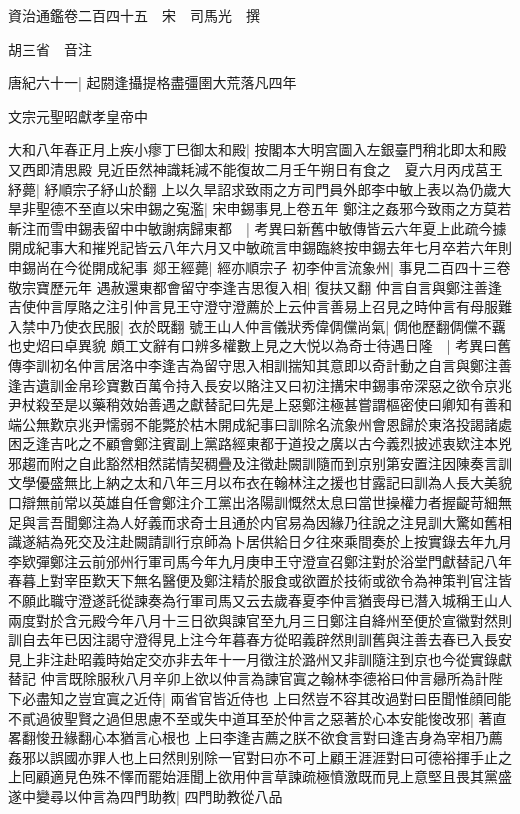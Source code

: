 資治通鑑卷二百四十五　宋　司馬光　撰

胡三省　音注

唐紀六十一|{
	起閼逢攝提格盡彊圉大荒落凡四年}


文宗元聖昭獻孝皇帝中

大和八年春正月上疾小瘳丁巳御太和殿|{
	按閣本大明宫圖入左銀臺門稍北即太和殿又西即清思殿}
見近臣然神識耗減不能復故二月壬午朔日有食之　夏六月丙戌莒王紓薨|{
	紓順宗子紓山於翻}
上以久旱詔求致雨之方司門員外郎李中敏上表以為仍歲大旱非聖德不至直以宋申錫之寃濫|{
	宋申錫事見上卷五年}
鄭注之姦邪今致雨之方莫若斬注而雪申錫表留中中敏謝病歸東都　|{
	考異曰新舊中敏傳皆云六年夏上此疏今據開成紀事大和摧兇記皆云八年六月又中敏疏言申錫臨終按申錫去年七月卒若六年則申錫尚在今從開成紀事}
郯王經薨|{
	經亦順宗子}
初李仲言流象州|{
	事見二百四十三卷敬宗寶歷元年}
遇赦還東都會留守李逢吉思復入相|{
	復扶又翻}
仲言自言與鄭注善逢吉使仲言厚賂之注引仲言見王守澄守澄薦於上云仲言善易上召見之時仲言有母服難入禁中乃使衣民服|{
	衣於既翻}
號王山人仲言儀狀秀偉倜儻尚氣|{
	倜他歷翻倜儻不覊也史炤曰卓異貌}
頗工文辭有口辨多權數上見之大悦以為奇士待遇日隆　|{
	考異曰舊傳李訓初名仲言居洛中李逢吉為留守思入相訓揣知其意即以奇計動之自言與鄭注善逢吉遺訓金帛珍寶數百萬令持入長安以賂注又曰初注搆宋申錫事帝深惡之欲令京兆尹杖殺至是以藥稍效始善遇之獻替記曰先是上惡鄭注極甚嘗謂樞密使曰卿知有善和端公無歎京兆尹懦弱不能斃於枯木開成紀事曰訓除名流象州會恩歸於東洛投謁諸處困乏逢吉叱之不顧會鄭注賓副上黨路經東都于道投之廣以古今義烈披述衷欵注本兇邪趨而附之自此豁然相然諾情契稠疊及注徵赴闕訓隨而到京别第安置注因陳奏言訓文學優盛無比上納之太和八年三月以布衣在翰林注之援也甘露記曰訓為人長大美貌口辯無前常以英雄自任會鄭注介工黨出洛陽訓慨然太息曰當世操權力者握齪苛細無足與言吾聞鄭注為人好義而求奇士且通於内官易為因緣乃往說之注見訓大驚如舊相識遂結為死交及注赴闕請訓行京師為卜居供給日夕往來乘間奏於上按實錄去年九月李欵彈鄭注云前邠州行軍司馬今年九月庚申王守澄宣召鄭注對於浴堂門獻替記八年春暮上對宰臣歎天下無名醫便及鄭注精於服食或欲置於技術或欲令為神策判官注皆不願此職守澄遂託從諫奏為行軍司馬又云去歲春夏李仲言猶喪母已潛入城稱王山人兩度對於含元殿今年八月十三日欲與諫官至九月三日鄭注自絳州至便於宣徽對然則訓自去年已因注謁守澄得見上注今年暮春方從昭義辟然則訓舊與注善去春已入長安見上非注赴昭義時始定交亦非去年十一月徵注於潞州又非訓隨注到京也今從實錄獻替記}
仲言既除服秋八月辛卯上欲以仲言為諫官寘之翰林李德裕曰仲言曏所為計陛下必盡知之豈宜寘之近侍|{
	兩省官皆近侍也}
上曰然豈不容其改過對曰臣聞惟顔囘能不貳過彼聖賢之過但思慮不至或失中道耳至於仲言之惡著於心本安能悛改邪|{
	著直畧翻悛丑緣翻心本猶言心根也}
上曰李逢吉薦之朕不欲食言對曰逢吉身為宰相乃薦姦邪以誤國亦罪人也上曰然則别除一官對曰亦不可上顧王涯涯對曰可德裕揮手止之上囘顧適見色殊不懌而罷始涯聞上欲用仲言草諫疏極憤激既而見上意堅且畏其黨盛遂中變尋以仲言為四門助教|{
	四門助教從八品}
